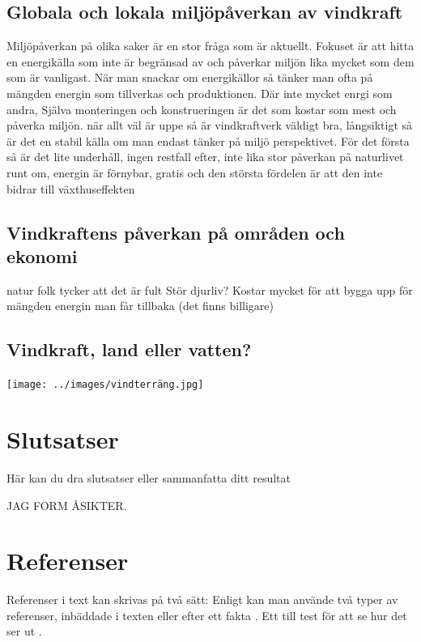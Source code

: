 \documentclass[11p]{article}
\begin{document}
    \subsection{Globala och lokala miljöpåverkan av vindkraft}
    Miljöpåverkan på olika saker är en stor fråga som är aktuellt.
    Fokuset är att hitta en energikälla som inte är begränsad av och påverkar miljön lika mycket som dem som är vanligast.
    När man snackar om energikällor så tänker man ofta på mängden energin som tillverkas och produktionen.
    Där inte mycket enrgi som andra,
    Själva monteringen och konstrueringen är det som kostar som mest och påverka miljön.
    när allt väl är uppe så är vindkraftverk väldigt bra, långsiktigt så är det en stabil källa om man endast tänker på miljö perspektivet.
    För det första så är det lite underhåll, ingen restfall efter, inte lika stor påverkan på naturlivet runt om, energin är förnybar, gratis och den största fördelen är att den inte bidrar till växthuseffekten


    \subsection{Vindkraftens påverkan på områden och ekonomi}
    natur folk tycker att det är fult
    Stör djurliv?
    Kostar mycket för att bygga upp för mängden energin man får tillbaka (det finns billigare)
    \subsection{Vindkraft, land eller vatten?}

    \texttt{[image: ../images/vindterräng.jpg]}

    \subsection{}

    \section{Slutsatser}
    Här kan du dra slutsatser eller sammanfatta ditt resultat

    JAG FORM ÅSIKTER.


    \section{Referenser}
    Referenser i text kan skrivas på två sätt: Enligt \textcite{Jens} kan man använde två typer av referenser, inbäddade i texten eller efter ett fakta \parencite{Fraenkel}. Ett till test för att se hur det ser ut \parencite[sid 55]{fermi}.
\end{document}
